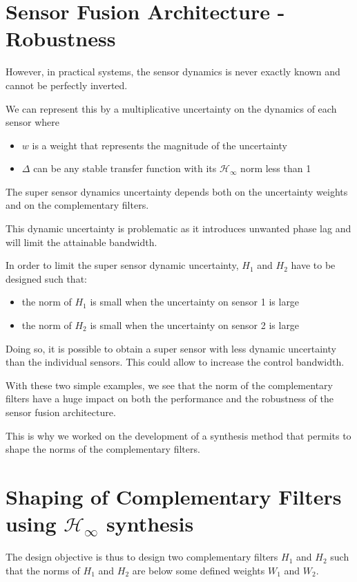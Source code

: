 \documentclass[hangsection=false, titlepage=false, tocnp=false]{cleanreport}
\begin{document}
\section{Sensor Fusion Architecture - Robustness}
\label{sec:org0b2c003}
However, in practical systems, the sensor dynamics is never exactly known and cannot be perfectly inverted.

We can represent this by a multiplicative uncertainty on the dynamics of each sensor where
\begin{itemize}
\item \(w\) is a weight that represents the magnitude of the uncertainty
\item \(\Delta\) can be any stable transfer function with its \(\mathcal{H}_\infty\) norm less than 1
\end{itemize}

The super sensor dynamics uncertainty depends both on the uncertainty weights and on the complementary filters.

This dynamic uncertainty is problematic as it introduces unwanted phase lag and will limit the attainable bandwidth.

In order to limit the super sensor dynamic uncertainty, \(H_1\) and \(H_2\) have to be designed such that:
\begin{itemize}
\item the norm of \(H_1\) is small when the uncertainty on sensor 1 is large
\item the norm of \(H_2\) is small when the uncertainty on sensor 2 is large
\end{itemize}

Doing so, it is possible to obtain a super sensor with less dynamic uncertainty than the individual sensors.
This could allow to increase the control bandwidth.

With these two simple examples, we see that the norm of the complementary filters have a huge impact on both the performance and the robustness of the sensor fusion architecture.

This is why we worked on the development of a synthesis method that permits to shape the norms of the complementary filters.

\section{Shaping of Complementary Filters using \(\mathcal{H}_\infty\) synthesis}
\label{sec:org6d76257}
The design objective is thus to design two complementary filters \(H_1\) and \(H_2\) such that the norms of \(H_1\) and \(H_2\) are below some defined weights \(W_1\) and \(W_2\).
\end{document}
